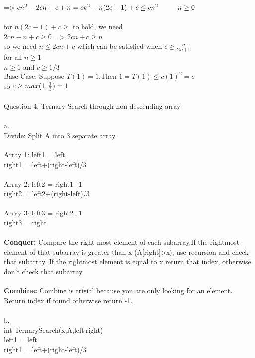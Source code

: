 \documentclass[12pt]{article}
\newcommand\tab[1][1cm]{\hspace*{#1}}
\begin{document}
\tab\tab => $cn^2 - 2cn+c+n = cn^2 -n(2c-1)+c \leq cn^2 \tab n\ge 0$\\\\
\tab\tab for $n(2c-1)+c \ge $ to hold, we need\\
\tab\tab $2cn-n+c\ge0$ => $2cn+c \ge n$\\
\tab\tab so we need $n\leq 2cn+c $ which can be satisfied when $c\ge {n\over2n+1}$\\
\tab\tab for all $n\ge 1$\\
\tab\tab $n\ge 1$ and $c\ge 1/3$\\
\tab\tab Base Case: Suppose $T(1)=1$.Then $1 = T(1) \leq c(1)^2 = c$\\
\tab\tab so $c\ge max(1,{1\over3}) =1$\\\\
Question 4: Ternary Search through non-descending array\\\\
\tab\tab a.\\
\tab\tab Divide: Split A into 3 separate array. \\\\
\tab\tab\tab Array 1: \:\:left1 = left\\
\tab\tab\tab\tab\tab right1 = left+(right-left)/3\\\\
\tab\tab\tab Array 2: \:\:left2 = right1+1\\
\tab\tab\tab\tab\tab right2 = left2+(right-left)/3\\\\
\tab\tab\tab Array 3: \:\:left3 = right2+1\\
\tab\tab\tab\tab\tab right3 = right\\\\
\tab\tab \textbf{Conquer:} Compare the right most element of each subarray.If the rightmost element of that subarray is greater than x (A[right]>x), use recursion and check that subarray. If the rightmost element is equal to x return that index, otherwise don't check that subarray.\\\\
\tab\tab \textbf{Combine:} Combine is trivial because you are only looking for an element. Return index if found otherwise return -1.\\\\
\tab\tab b.\\
\tab\tab int TernarySearch(x,A,left,right)\\
\tab\tab\tab left1 = left\\
\tab\tab\tab right1 = left+(right-left)/3\\
\end{document}
